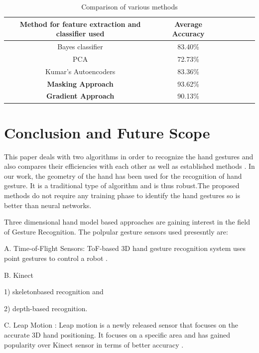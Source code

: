 \documentclass[conference]{IEEEtran}
\begin{document}
\begin{table}[h!]
\caption{Comparison of various methods}
\begin{center}
\begin{tabular}{|c|c|c|c|c|c|c|}
\hline
Method for feature extraction and classifier used & Average Accuracy \\ \hline
Bayes classifier \cite{Avraam2014StaticGR} & 83.40\% \\ \hline
PCA & 72.73\% \\ \hline
Kumar's Autoencoders \cite{kumar2014static} & 83.36\% \\ \hline
\textbf{Masking Approach} & 93.62\% \\ \hline
\textbf{Gradient Approach} & 90.13\% \\ \hline
\end{tabular}
\end{center}
\end{table}


\section{Conclusion and Future Scope}
This paper deals with two algorithms in order to recognize the hand gestures and also compares their efficiencies with each other as well as established methods \cite{khan2012hand}. In our work, the geometry of the hand has been used for the recognition of hand gesture. It is a traditional type of algorithm and is thus robust.The proposed methods do not require any training phase \cite{7813732} to identify the hand gestures so is better than neural networks. 

Three dimensional hand model based approaches \cite{cheng2016survey} are gaining interest in the field of Gesture Recognition.
The polpular gesture sensors used presesntly are:

A. Time-of-Flight Sensors:
ToF-based 3D hand gesture recognition system uses point gestures to control a robot \cite{droeschel2011learning}.

B. Kinect

 1) skeletonbased recognition \cite{shotton2013real} and 
 
 2) depth-based recognition.

C. Leap Motion : Leap motion is a newly released sensor that focuses on the accurate 3D hand positioning. It focuses on a specific area and has gained popularity over Kinect sensor in terms of better accuracy \cite{regenbrecht2013leap}.
\end{document}
